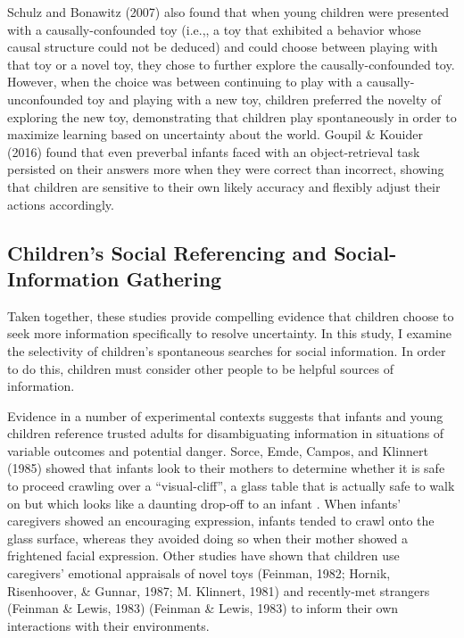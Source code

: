 \documentclass[floatsintext,man]{apa6}
\theoremstyle{definition}
\theoremstyle{definition}
\theoremstyle{definition}
\theoremstyle{remark}
\begin{document}
Schulz and Bonawitz (2007) also found that when young children were
presented with a causally-confounded toy (i.e.,, a toy that exhibited a
behavior whose causal structure could not be deduced) and could choose
between playing with that toy or a novel toy, they chose to further
explore the causally-confounded toy. However, when the choice was
between continuing to play with a causally-unconfounded toy and playing
with a new toy, children preferred the novelty of exploring the new toy,
demonstrating that children play spontaneously in order to maximize
learning based on uncertainty about the world. Goupil \& Kouider (2016)
found that even preverbal infants faced with an object-retrieval task
persisted on their answers more when they were correct than incorrect,
showing that children are sensitive to their own likely accuracy and
flexibly adjust their actions accordingly.

\subsection{Children's Social Referencing and Social-Information
Gathering}\label{childrens-social-referencing-and-social-information-gathering}

Taken together, these studies provide compelling evidence that children
choose to seek more information specifically to resolve uncertainty. In
this study, I examine the selectivity of children's spontaneous searches
for social information. In order to do this, children must consider
other people to be helpful sources of information.

Evidence in a number of experimental contexts suggests that infants and
young children reference trusted adults for disambiguating information
in situations of variable outcomes and potential danger. Sorce, Emde,
Campos, and Klinnert (1985) showed that infants look to their mothers to
determine whether it is safe to proceed crawling over a
\enquote{visual-cliff}, a glass table that is actually safe to walk on
but which looks like a daunting drop-off to an infant . When infants'
caregivers showed an encouraging expression, infants tended to crawl
onto the glass surface, whereas they avoided doing so when their mother
showed a frightened facial expression. Other studies have shown that
children use caregivers' emotional appraisals of novel toys (Feinman,
1982; Hornik, Risenhoover, \& Gunnar, 1987; M. Klinnert, 1981) and
recently-met strangers (Feinman \& Lewis, 1983) (Feinman \& Lewis, 1983)
to inform their own interactions with their environments.
\end{document}
